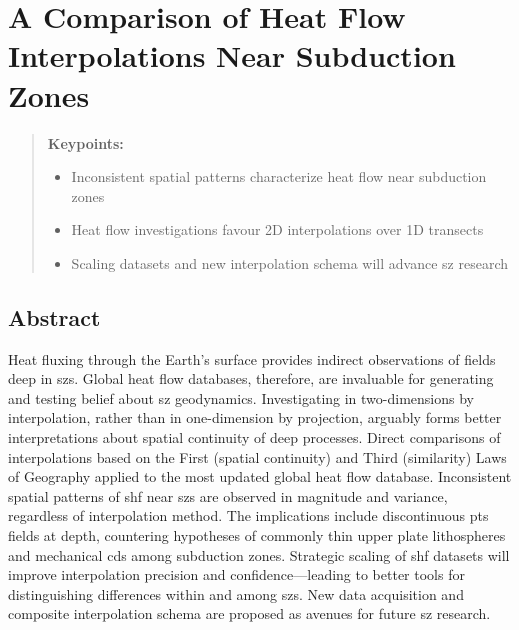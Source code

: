 \hypertarget{chpt3}{%
\chapter{A Comparison of Heat Flow Interpolations Near Subduction Zones}\label{chpt3}}


\begin{quote}
\textbf{Keypoints:}

\begin{itemize}
\item
  Inconsistent spatial patterns characterize heat flow near subduction zones
\item
  Heat flow investigations favour 2D interpolations over 1D transects
\item
  Scaling datasets and new interpolation schema will advance \gls{sz} research
\end{itemize}
\end{quote}

\hypertarget{abstract-1}{%
\section{Abstract}\label{abstract-1}}

Heat fluxing through the Earth's surface provides indirect observations of  fields deep in \glspl{sz}. Global heat flow databases, therefore, are invaluable for generating and testing belief about \gls{sz} geodynamics. Investigating  in two-dimensions by interpolation, rather than in one-dimension by projection, arguably forms better interpretations about spatial continuity of deep processes. Direct comparisons of interpolations based on the First (spatial continuity) and Third (similarity) Laws of Geography applied to the most updated global heat flow database. Inconsistent spatial patterns of \gls{shf} near \glspl{sz} are observed in magnitude and variance, regardless of interpolation method. The implications include discontinuous \gls{pts} fields at depth, countering hypotheses of commonly thin upper plate lithospheres and mechanical \glspl{cd} among subduction zones. Strategic scaling of \gls{shf} datasets will improve interpolation precision and confidence---leading to better tools for distinguishing differences within and among \glspl{sz}. New data acquisition and composite interpolation schema are proposed as avenues for future \gls{sz} research.

\cleardoublepage

\hypertarget{refs}{}
\begin{CSLReferences}{0}{0}
\end{CSLReferences}


\renewcommand\bibname{REFERENCES}
\cleardoublepage
{}




